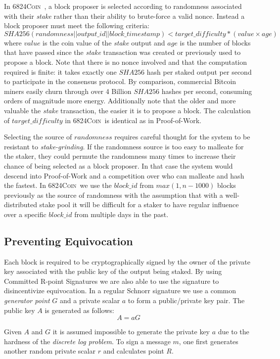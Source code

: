 \documentclass{article}
\newcommand{\coin}{ \textsc{6824Coin}\ }
\begin{document}
In \coin, a block proposer is selected according to randomness associated with their \textit{stake} rather than their ability to brute-force a valid nonce. Instead a block proposer must meet the following criteria:  
$$SHA256(randomness || output\_id || block\_timestamp) < target\_difficulty * (value \times age) $$ 
where $value$ is the coin value of the \textit{stake} output and $age$ is the number of blocks that have passed since the \textit{stake} transaction was created or previously used to propose a block. Note that there is no nonce involved and that the computation required is finite: it takes exactly one $SHA256$ hash per staked output per second to participate in the consensus protocol. By comparison, commercial Bitcoin miners easily churn through over 4 Billion $SHA256$ hashes per second, consuming orders of magnitude more energy. Additionally note that the older and more valuable the \textit{stake} transaction, the easier it is to propose a block. The calculation of $target\_difficulty$ in \coin is identical as in Proof-of-Work. 

Selecting the source of $randomness$ requires careful thought for the system to be resistant to \textit{stake-grinding}. If the randomness source is too easy to malleate for the staker, they could permute the randomness many times to increase their chance of being selected as a block proposer. In that case the system would descend into Proof-of-Work and a competition over who can malleate and hash the fastest. In \coin we use the $ block\_id $ from $ max(1, n - 1000) $ blocks previously as the source of randomness with the assumption that with a well-distributed stake pool it will be difficult for a staker to have regular influence over a specific $block\_id$ from multiple days in the past. 

\subsection{Preventing Equivocation}
Each block is required to be cryptographically signed by the owner of the private key associated with the public key of the output being staked. By using Committed R-point Signatures \cite{dlc} we are also able to use the signature to disincentivize equivocation. In a regular Schnorr signature we use a common \textit{generator point} $ G $ and a private scalar $ a $ to form a public/private key pair. The public key $ A $ is generated as follows:
$$ A = aG $$

Given $ A $ and $ G $ it is assumed impossible to generate the private key $ a $ due to the hardness of the \textit{discrete log problem}. To sign a message $ m $, one first generates another random private scalar $ r $ and calculates point $ R $.
\end{document}
